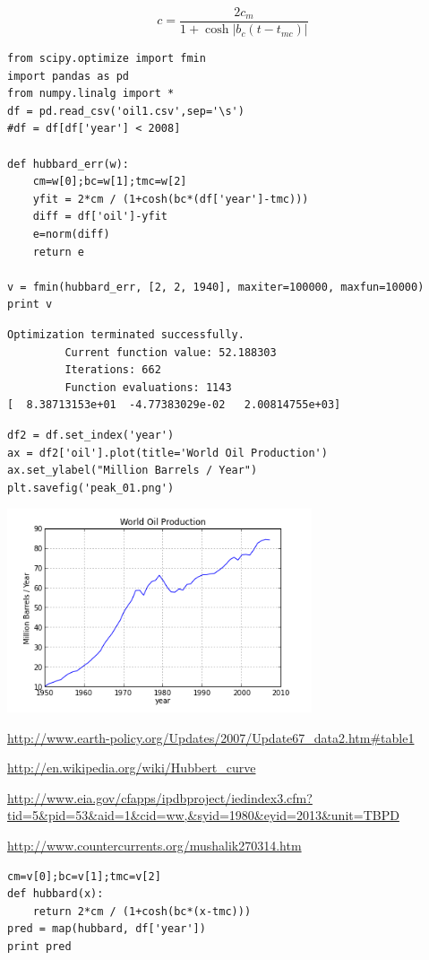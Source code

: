 \documentclass[12pt,fleqn]{article}\usepackage{../common}
\begin{document}
$$ 
c = \frac{ 2c_m}{1 + \cosh |b_c(t-t_{mc})|   }
$$


\begin{verbatim}
from scipy.optimize import fmin
import pandas as pd
from numpy.linalg import *
df = pd.read_csv('oil1.csv',sep='\s')
#df = df[df['year'] < 2008]

def hubbard_err(w):
    cm=w[0];bc=w[1];tmc=w[2]
    yfit = 2*cm / (1+cosh(bc*(df['year']-tmc)))
    diff = df['oil']-yfit
    e=norm(diff)
    return e

v = fmin(hubbard_err, [2, 2, 1940], maxiter=100000, maxfun=10000)
print v
\end{verbatim}

\begin{verbatim}
Optimization terminated successfully.
         Current function value: 52.188303
         Iterations: 662
         Function evaluations: 1143
[  8.38713153e+01  -4.77383029e-02   2.00814755e+03]
\end{verbatim}

\begin{verbatim}
df2 = df.set_index('year')
ax = df2['oil'].plot(title='World Oil Production')
ax.set_ylabel("Million Barrels / Year")
plt.savefig('peak_01.png')
\end{verbatim}




\includegraphics[height=6cm]{peak_01.png}

\url{http://www.earth-policy.org/Updates/2007/Update67_data2.htm#table1}

\url{http://en.wikipedia.org/wiki/Hubbert_curve}

\url{http://www.eia.gov/cfapps/ipdbproject/iedindex3.cfm?tid=5&pid=53&aid=1&cid=ww,&syid=1980&eyid=2013&unit=TBPD}

\url{http://www.countercurrents.org/mushalik270314.htm}


\begin{verbatim}
cm=v[0];bc=v[1];tmc=v[2]
def hubbard(x): 
    return 2*cm / (1+cosh(bc*(x-tmc)))
pred = map(hubbard, df['year'])
print pred
\end{verbatim}
\end{document}
